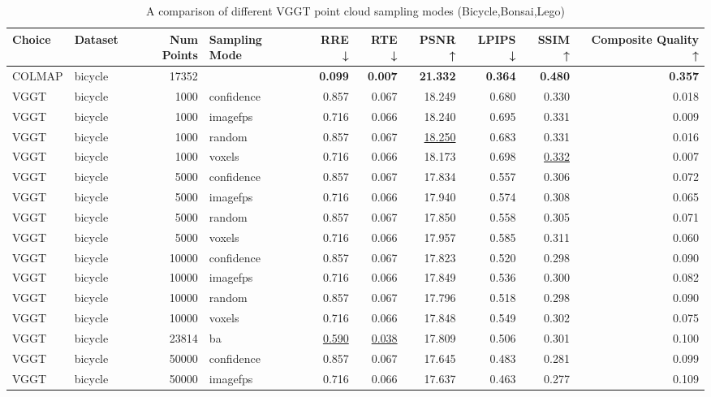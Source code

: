 \begin{table}[H]
\caption{\ifdefined\customcaption \customcaption \else A comparison of different VGGT point cloud sampling modes (Bicycle,Bonsai,Lego) \fi}
\label{tab:03_sampling_mode_bicycle,bonsai,lego}
\centering
\scriptsize
\begin{tabular}{llrlrrrrrr}
\toprule
Choice & Dataset & Num Points & Sampling Mode & RRE ↓ & RTE ↓ & PSNR ↑ & LPIPS ↓ & SSIM ↑ & Composite Quality ↑ \\
\midrule
COLMAP & bicycle & 17352 &  & \textbf{0.099} & \textbf{0.007} & \textbf{21.332} & \textbf{0.364} & \textbf{0.480} & \textbf{0.357} \\
VGGT & bicycle & 1000 & confidence & 0.857 & 0.067 & 18.249 & 0.680 & 0.330 & 0.018 \\
VGGT & bicycle & 1000 & imagefps & 0.716 & 0.066 & 18.240 & 0.695 & 0.331 & 0.009 \\
VGGT & bicycle & 1000 & random & 0.857 & 0.067 & \underline{18.250} & 0.683 & 0.331 & 0.016 \\
VGGT & bicycle & 1000 & voxels & 0.716 & 0.066 & 18.173 & 0.698 & \underline{0.332} & 0.007 \\
VGGT & bicycle & 5000 & confidence & 0.857 & 0.067 & 17.834 & 0.557 & 0.306 & 0.072 \\
VGGT & bicycle & 5000 & imagefps & 0.716 & 0.066 & 17.940 & 0.574 & 0.308 & 0.065 \\
VGGT & bicycle & 5000 & random & 0.857 & 0.067 & 17.850 & 0.558 & 0.305 & 0.071 \\
VGGT & bicycle & 5000 & voxels & 0.716 & 0.066 & 17.957 & 0.585 & 0.311 & 0.060 \\
VGGT & bicycle & 10000 & confidence & 0.857 & 0.067 & 17.823 & 0.520 & 0.298 & 0.090 \\
VGGT & bicycle & 10000 & imagefps & 0.716 & 0.066 & 17.849 & 0.536 & 0.300 & 0.082 \\
VGGT & bicycle & 10000 & random & 0.857 & 0.067 & 17.796 & 0.518 & 0.298 & 0.090 \\
VGGT & bicycle & 10000 & voxels & 0.716 & 0.066 & 17.848 & 0.549 & 0.302 & 0.075 \\
VGGT & bicycle & 23814 & ba & \underline{0.590} & \underline{0.038} & 17.809 & 0.506 & 0.301 & 0.100 \\
VGGT & bicycle & 50000 & confidence & 0.857 & 0.067 & 17.645 & 0.483 & 0.281 & 0.099 \\
VGGT & bicycle & 50000 & imagefps & 0.716 & 0.066 & 17.637 & 0.463 & 0.277 & 0.109 \\

\end{tabular}
\end{table}
